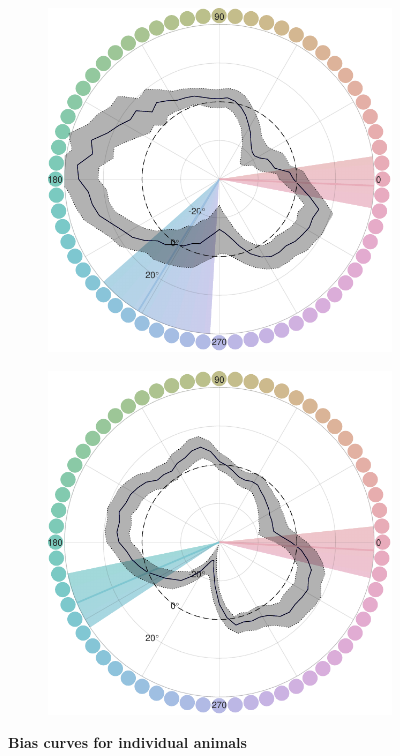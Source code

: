 \begin{figure}
    \begin{subfigure}[b]{0.49\textwidth}
         \centering
         \caption{}
         \includegraphics[width=\textwidth]{../../../Analyses/210609_124628_Buster/210428--210609_Buster_categorybias2_230225.pdf}    
         \label{fig:BiasCurvesBuster}
     \end{subfigure}
     \hfill
     \begin{subfigure}[b]{0.49\textwidth}
         \centering
         \caption{}
         \includegraphics[width=\textwidth]{../../../Analyses/220823_081207_Morty/220322--220823_Morty_categorybias2_230225.pdf}    
         \label{fig:BiasCurvesMorty}
     \end{subfigure}
        \caption{\textbf{Bias curves for individual animals} }
        \label{fig:BiasCurvesIndividual}
\end{figure}

